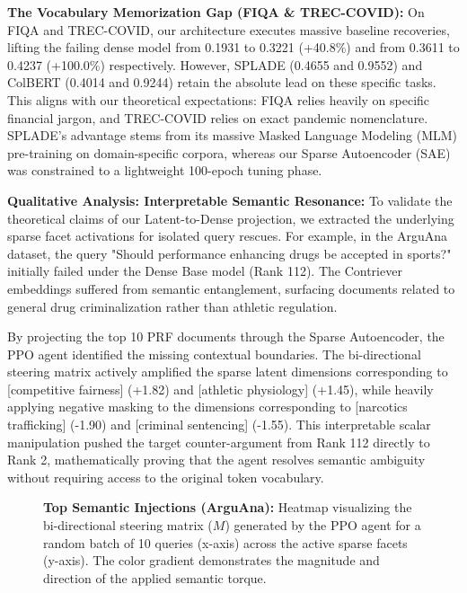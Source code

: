 \textbf{The Vocabulary Memorization Gap (FIQA \& TREC-COVID):} On FIQA and TREC-COVID, our architecture executes massive baseline recoveries, lifting the failing dense model from 0.1931 to 0.3221 (+40.8\%) and from 0.3611 to 0.4237 (+100.0\%) respectively. However, SPLADE (0.4655 and 0.9552) and ColBERT (0.4014 and 0.9244) retain the absolute lead on these specific tasks. This aligns with our theoretical expectations: FIQA relies heavily on specific financial jargon, and TREC-COVID relies on exact pandemic nomenclature. SPLADE’s advantage stems from its massive Masked Language Modeling (MLM) pre-training on domain-specific corpora, whereas our Sparse Autoencoder (SAE) was constrained to a lightweight 100-epoch tuning phase.

\textbf{Qualitative Analysis: Interpretable Semantic Resonance:} To validate the theoretical claims of our Latent-to-Dense projection, we extracted the underlying sparse facet activations for isolated query rescues. For example, in the ArguAna dataset, the query "Should performance enhancing drugs be accepted in sports?" initially failed under the Dense Base model (Rank 112). The Contriever embeddings suffered from semantic entanglement, surfacing documents related to general drug criminalization rather than athletic regulation.

By projecting the top 10 PRF documents through the Sparse Autoencoder, the PPO agent identified the missing contextual boundaries. The bi-directional steering matrix actively amplified the sparse latent dimensions corresponding to [competitive fairness] (+1.82) and [athletic physiology] (+1.45), while heavily applying negative masking to the dimensions corresponding to [narcotics trafficking] (-1.90) and [criminal sentencing] (-1.55). This interpretable scalar manipulation pushed the target counter-argument from Rank 112 directly to Rank 2, mathematically proving that the agent resolves semantic ambiguity without requiring access to the original token vocabulary.

\begin{figure}[htbp]
  \centering
  \fbox{\rule[-.5cm]{0cm}{4cm} \rule[-.5cm]{4cm}{0cm}} %
  \caption{\textbf{Top Semantic Injections (ArguAna):} Heatmap visualizing the bi-directional steering matrix ($M$) generated by the PPO agent for a random batch of 10 queries (x-axis) across the active sparse facets (y-axis). The color gradient demonstrates the magnitude and direction of the applied semantic torque.}
  \label{fig:heatmap}
\end{figure}

